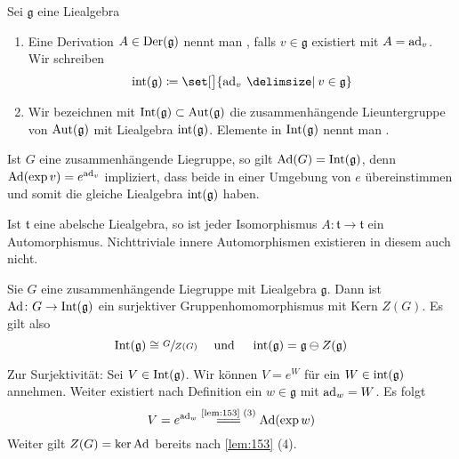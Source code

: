 \begin{definition}[{name=[innere Derivationen und innere Automorphismen]}]
	Sei $\mathfrak{g}$ eine Liealgebra
	\begin{enumerate}[1)]
		\item Eine Derivation $A \in \operatorname{Der}(\mathfrak{g})$ nennt man , falls $v \in \mathfrak{g}$ existiert mit $A = \operatorname{ad}_v$.
		Wir schreiben 
		\[
			\intAlg(\mathfrak{g}) \coloneqq \set[\big]{\ad_v \given v \in \mathfrak{g}}
		\] 
		\item Wir bezeichnen mit $\operatorname{Int}(\mathfrak{g}) \subset \operatorname{Aut}(\mathfrak{g})$ die zusammenhängende Lieuntergruppe von $\operatorname{Aut}(\mathfrak{g})$ mit Liealgebra $\operatorname{int}(\mathfrak{g})$.
		Elemente in $\operatorname{Int}(\mathfrak{g})$ nennt man .
	\end{enumerate}
\end{definition}

Ist $G$ eine zusammenhängende Liegruppe, so gilt $\operatorname{Ad}(G) = \operatorname{Int}(\mathfrak{g})$, denn $\Ad \enbrace*{\exp v} = e^{\ad_{v}}$ impliziert, dass beide in einer Umgebung von $e$ übereinstimmen und somit die gleiche Liealgebra $\operatorname{int}(\mathfrak{g})$ haben.

\begin{beispiel*}[{name=[Automorphismen einer abelsche Liealgebra]}]
	Ist $\mathfrak{t}$ eine abelsche Liealgebra, so ist jeder Isomorphismus $A \colon \mathfrak{t} \to \mathfrak{t}$ ein Automorphismus.
	Nichttriviale innere Automorphismen existieren in diesem auch nicht.
\end{beispiel*}

\begin{lemma}[{name=[Adjungierte Darstellung surjektiv auf innere Automorphismen (zusammenhängend)]}]
	Sie $G$ eine zusammenhängende Liegruppe mit Liealgebra $\mathfrak{g}$.
	Dann ist $\operatorname{Ad} \colon G \to \operatorname{Int}(\mathfrak{g})$ ein surjektiver Gruppenhomomorphismus mit Kern $Z(G)$.
	Es gilt also
	\[
		\operatorname{Int}(\mathfrak{g}) \cong \sfrac{G}{Z(G)} \quad \text{ und } \quad \operatorname{int}(\mathfrak{g}) = \mathfrak{g} \ominus Z(\mathfrak{g})
	\]
\end{lemma}
\begin{beweis}
	Zur Surjektivität: Sei $V \in \operatorname{Int}(\mathfrak{g})$.
	Wir können $V= e^W$ für ein $W \in \operatorname{int}(\mathfrak{g})$ annehmen.
	Weiter existiert nach Definition ein $w \in \mathfrak{g}$ mit $\operatorname{ad}_w = W$.
	Es folgt
	\[
		V = e^{\ad_w} \StackText{\ref{lem:153} (3)}{=\joinrel=\joinrel=} \Ad(\exp w)
	\]
	Weiter gilt $Z(G)= \ker \operatorname{Ad}$ bereits nach \autoref{lem:153} (4).
\end{beweis}

